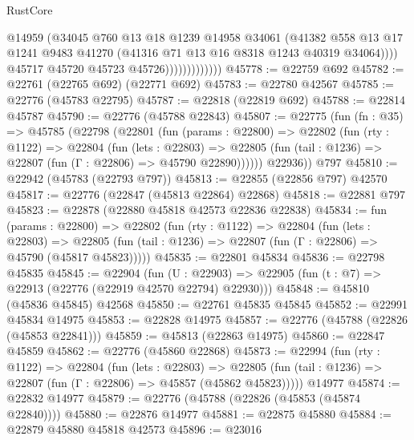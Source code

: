 \begin{lexlean}{RustCore}
\begin{coremodule}
                                @14959
                                (@34045
                                  @760
                                  @13
                                  @18
                                  @1239
                                  @14958
                                  @34061
                                  (@41382
                                    @558
                                    @13
                                    @17
                                    @1241
                                    @9483
                                    @41270
                                    (@41316 @71 @13 @16 @8318 @1243 @40319 @34064))))
                              @45717
                              @45720
                              @45723
                              @45726)))))))))))))
@45778 := @22759 @692
@45782 := @22761 (@22765 @692) (@22771 @692)
@45783 := @22780 @42567
@45785 := @22776 (@45783 @22795)
@45787 := @22818 (@22819 @692)
@45788 := @22814 @45787
@45790 := @22776 (@45788 @22843)
@45807 := @22775
    (fun (fn : @35) =>
    @45785
      (@22798
        (@22801
          (fun (params : @22800) =>
          @22802
            (fun (rty : @1122) =>
            @22804
              (fun (lets : @22803) =>
              @22805 (fun (tail : @1236) => @22807 (fun (Γ : @22806) => @45790 @22890))))))
        @22936))
    @797
@45810 := @22942 (@45783 (@22793 @797))
@45813 := @22855 (@22856 @797) @42570
@45817 := @22776 (@22847 (@45813 @22864) @22868)
@45818 := @22881 @797
@45823 := @22878 (@22880 @45818 @42573 @22836 @22838)
@45834 := fun (params : @22800) =>
  @22802
    (fun (rty : @1122) =>
    @22804
      (fun (lets : @22803) =>
      @22805 (fun (tail : @1236) => @22807 (fun (Γ : @22806) => @45790 (@45817 @45823)))))
@45835 := @22801 @45834
@45836 := @22798 @45835
@45845 := @22904
    (fun (U : @22903) => @22905 (fun (t : @7) => @22913 (@22776 (@22919 @42570 @22794) @22930)))
@45848 := @45810 (@45836 @45845) @42568
@45850 := @22761 @45835 @45845
@45852 := @22991 @45834 @14975
@45853 := @22828 @14975
@45857 := @22776 (@45788 (@22826 (@45853 @22841)))
@45859 := @45813 (@22863 @14975)
@45860 := @22847 @45859
@45862 := @22776 (@45860 @22868)
@45873 := @22994
    (fun (rty : @1122) =>
    @22804
      (fun (lets : @22803) =>
      @22805 (fun (tail : @1236) => @22807 (fun (Γ : @22806) => @45857 (@45862 @45823)))))
    @14977
@45874 := @22832 @14977
@45879 := @22776 (@45788 (@22826 (@45853 (@45874 @22840))))
@45880 := @22876 @14977
@45881 := @22875 @45880
@45884 := @22879 @45880 @45818 @42573
@45896 := @23016

\end{coremodule}
\end{lexlean}

